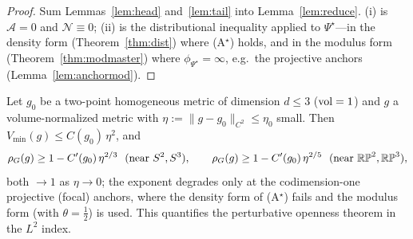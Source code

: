 \begin{proof}
Sum Lemmas~\ref{lem:head} and~\ref{lem:tail} into Lemma~\ref{lem:reduce}. (i) is
$\mathcal A=0$ and $\mathcal N\equiv0$; (ii) is the distributional inequality applied to
$\Psi^\star$---in the density form (Theorem~\ref{thm:dist}) where (A$^\star$) holds, and in the
modulus form (Theorem~\ref{thm:modmaster}) where $\phi_{\Psi^\star}=\infty$, e.g.\ the
projective anchors (Lemma~\ref{lem:anchormod}).
\end{proof}

\begin{corollary}\label{cor:pert}
Let $g_0$ be a two-point homogeneous metric of dimension $d\le3$ ($\operatorname{vol}=1$) and $g$ a
volume-normalized metric with $\eta:=\lVert g-g_0\rVert_{C^2}\le\eta_0$ small. Then
$V_{\min}(g)\le C(g_0)\,\eta^2$, and
\[
\rhoG(g)\ge1-C'(g_0)\,\eta^{2/3}\ \ (\text{near }S^2,S^3),\qquad
\rhoG(g)\ge1-C'(g_0)\,\eta^{2/5}\ \ (\text{near }\mathbb{RP}^2,\mathbb{RP}^3),
\]
both $\to1$ as $\eta\to0$; the exponent degrades only at the codimension-one projective
(focal) anchors, where the density form of (A$^\star$) fails and the modulus form (with
$\theta=\tfrac12$) is used. This quantifies the perturbative openness theorem in the $L^2$
index.
\end{corollary}

